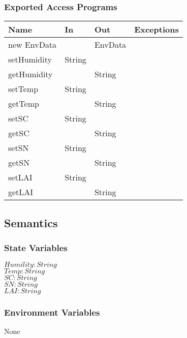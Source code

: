 \documentclass[12pt, titlepage]{article}
\begin{document}
\subsubsection{Exported Access Programs}

\begin{center}
\begin{tabular}{|l|l|l| p{5cm}|}
\hline
\textbf{Name} & \textbf{In} & \textbf{Out} & \textbf{Exceptions} \\
\hline
new EnvData & & EnvData & \\
\hline

setHumidity & String & & \\
\hline
getHumidity & &String & \\
\hline

setTemp & String & &\\
\hline
getTemp & &String & \\
\hline

setSC & String & & \\
\hline
getSC & &String & \\
\hline

setSN & String & & \\
\hline
getSN & &String & \\
\hline

setLAI & String & & \\
\hline
getLAI & &String & \\
\hline
\end{tabular}
\end{center}

\subsection{Semantics}

\subsubsection{State Variables}
$\mathit{Humility: String}$\\
$\mathit{Temp: String}$\\
$\mathit{SC: String}$\\
$\mathit{SN: String}$\\
$\mathit{LAI: String}$\\

\subsubsection{Environment Variables}
None
\end{document}
